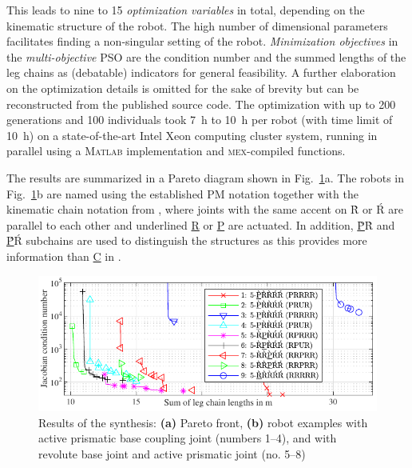 \documentclass[
	graybox,
	vecphys] %
	{svmult}
\begin{document}
This leads to nine to 15 \emph{optimization variables} in total, depending on the kinematic structure of the robot. 
The high number of dimensional parameters facilitates finding a non-singular setting of the robot. %
%
\emph{Minimization objectives} in the \emph{multi-objective} PSO are the condition number and the summed lengths of the leg chains as (debatable) indicators for general feasibility.
A further elaboration on the optimization details is omitted for the sake of brevity but can be reconstructed from the published source code.
The optimization with up to 200 generations and 100 individuals took \SI{7}{\hour} to \SI{10}{\hour} per robot (with time limit of \SI{10}{\hour}) on a state-of-the-art Intel Xeon computing cluster system, running in parallel using a \textsc{Matlab} implementation and \textsc{mex}-compiled functions.

The results are summarized in a Pareto diagram shown in Fig.~\ref{fig:results}a.
%
The robots in Fig.~\ref{fig:results}b are named using the established PM notation \cite{Merlet2006} together with the kinematic chain notation from \cite{KongGos2007}, where joints with the same accent on \`R or \'R are parallel to each other and underlined \underline{R} or \underline{P} are actuated.
In addition, \underline{\`P}\`R and \underline{\'P}\'R subchains are used to distinguish the structures as this provides more information than \underline{C} in \cite{MasoulehSaaGosTag2010}.

\begin{figure}[tb]
\vspace{-0.1cm}
\centering
\includegraphics{pareto_all.pdf}

\vspace{-0.1cm}
\caption{Results of the synthesis: \textbf{(a)} Pareto front, \textbf{(b)} robot examples with active prismatic base coupling joint (numbers 1--4), and with revolute base joint and active prismatic joint (no. 5--8)}
\label{fig:results}
\vspace{-0.4cm}
\end{figure}
\end{document}
